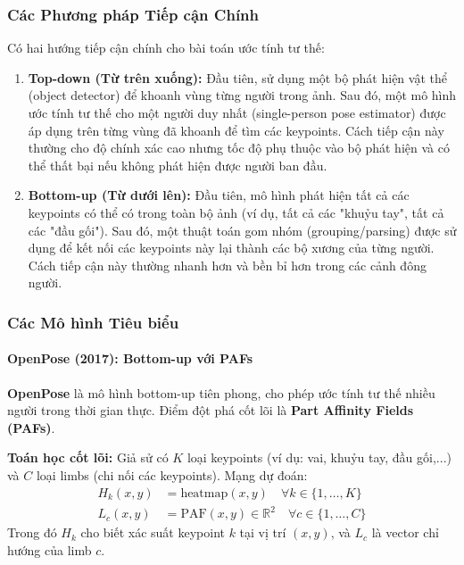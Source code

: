 \subsubsection{Các Phương pháp Tiếp cận Chính}
\label{subsubsec:pose_estimation_approaches}
Có hai hướng tiếp cận chính cho bài toán ước tính tư thế:
\begin{enumerate}
	\item \textbf{Top-down (Từ trên xuống):} Đầu tiên, sử dụng một bộ phát hiện vật thể (object detector) để khoanh vùng từng người trong ảnh. Sau đó, một mô hình ước tính tư thế cho một người duy nhất (single-person pose estimator) được áp dụng trên từng vùng đã khoanh để tìm các keypoints. Cách tiếp cận này thường cho độ chính xác cao nhưng tốc độ phụ thuộc vào bộ phát hiện và có thể thất bại nếu không phát hiện được người ban đầu.
	\item \textbf{Bottom-up (Từ dưới lên):} Đầu tiên, mô hình phát hiện tất cả các keypoints có thể có trong toàn bộ ảnh (ví dụ, tất cả các "khuỷu tay", tất cả các "đầu gối"). Sau đó, một thuật toán gom nhóm (grouping/parsing) được sử dụng để kết nối các keypoints này lại thành các bộ xương của từng người. Cách tiếp cận này thường nhanh hơn và bền bỉ hơn trong các cảnh đông người.
\end{enumerate}

\subsubsection{Các Mô hình Tiêu biểu}
\label{subsubsec:pose_estimation_models}

\paragraph{OpenPose (2017): Bottom-up với PAFs} 
\textbf{OpenPose} \cite{Cao2017} là mô hình bottom-up tiên phong, cho phép ước tính tư thế nhiều người trong thời gian thực. Điểm đột phá cốt lõi là \textbf{Part Affinity Fields (PAFs)}.

\textbf{Toán học cốt lõi:}  
Giả sử có $K$ loại keypoints (ví dụ: vai, khuỷu tay, đầu gối,...) và $C$ loại limbs (chi nối các keypoints). Mạng dự đoán:
\begin{align}
	H_k(x,y) &= \text{heatmap}(x,y) \quad \forall k \in \{1,\dots,K\} \\
	L_c(x,y) &= \text{PAF}(x,y) \in \mathbb{R}^2 \quad \forall c \in \{1,\dots,C\}
\end{align}
Trong đó $H_k$ cho biết xác suất keypoint $k$ tại vị trí $(x,y)$, và $L_c$ là vector chỉ hướng của limb $c$.  

